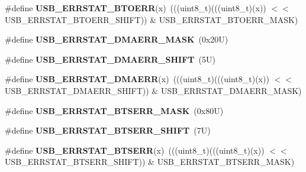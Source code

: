 \begin{DoxyCompactItemize}
\item 
\mbox{\label{group___u_s_b___register___masks_ga0f32da23ed144ba6c95ef2e68c22c4f7}} 
\#define {\bfseries U\+S\+B\+\_\+\+E\+R\+R\+S\+T\+A\+T\+\_\+\+B\+T\+O\+E\+RR}(x)~(((uint8\+\_\+t)(((uint8\+\_\+t)(x)) $<$$<$ U\+S\+B\+\_\+\+E\+R\+R\+S\+T\+A\+T\+\_\+\+B\+T\+O\+E\+R\+R\+\_\+\+S\+H\+I\+FT)) \& U\+S\+B\+\_\+\+E\+R\+R\+S\+T\+A\+T\+\_\+\+B\+T\+O\+E\+R\+R\+\_\+\+M\+A\+SK)
\item 
\mbox{\label{group___u_s_b___register___masks_ga3941bf3fbbca724b3b26a09bb2432581}} 
\#define {\bfseries U\+S\+B\+\_\+\+E\+R\+R\+S\+T\+A\+T\+\_\+\+D\+M\+A\+E\+R\+R\+\_\+\+M\+A\+SK}~(0x20\+U)
\item 
\mbox{\label{group___u_s_b___register___masks_ga2e3f280874ee203f1f801206ab4254be}} 
\#define {\bfseries U\+S\+B\+\_\+\+E\+R\+R\+S\+T\+A\+T\+\_\+\+D\+M\+A\+E\+R\+R\+\_\+\+S\+H\+I\+FT}~(5\+U)
\item 
\mbox{\label{group___u_s_b___register___masks_ga8a112763a1361e1452f77f165a289833}} 
\#define {\bfseries U\+S\+B\+\_\+\+E\+R\+R\+S\+T\+A\+T\+\_\+\+D\+M\+A\+E\+RR}(x)~(((uint8\+\_\+t)(((uint8\+\_\+t)(x)) $<$$<$ U\+S\+B\+\_\+\+E\+R\+R\+S\+T\+A\+T\+\_\+\+D\+M\+A\+E\+R\+R\+\_\+\+S\+H\+I\+FT)) \& U\+S\+B\+\_\+\+E\+R\+R\+S\+T\+A\+T\+\_\+\+D\+M\+A\+E\+R\+R\+\_\+\+M\+A\+SK)
\item 
\mbox{\label{group___u_s_b___register___masks_ga9cfa1a07c56005e5d545ecf363c4e916}} 
\#define {\bfseries U\+S\+B\+\_\+\+E\+R\+R\+S\+T\+A\+T\+\_\+\+B\+T\+S\+E\+R\+R\+\_\+\+M\+A\+SK}~(0x80\+U)
\item 
\mbox{\label{group___u_s_b___register___masks_ga4827905bfe176b3ba2992ce3ff9a4575}} 
\#define {\bfseries U\+S\+B\+\_\+\+E\+R\+R\+S\+T\+A\+T\+\_\+\+B\+T\+S\+E\+R\+R\+\_\+\+S\+H\+I\+FT}~(7\+U)
\item 
\mbox{\label{group___u_s_b___register___masks_ga39fb37eab07bf9b12d9ef56c7181a511}} 
\#define {\bfseries U\+S\+B\+\_\+\+E\+R\+R\+S\+T\+A\+T\+\_\+\+B\+T\+S\+E\+RR}(x)~(((uint8\+\_\+t)(((uint8\+\_\+t)(x)) $<$$<$ U\+S\+B\+\_\+\+E\+R\+R\+S\+T\+A\+T\+\_\+\+B\+T\+S\+E\+R\+R\+\_\+\+S\+H\+I\+FT)) \& U\+S\+B\+\_\+\+E\+R\+R\+S\+T\+A\+T\+\_\+\+B\+T\+S\+E\+R\+R\+\_\+\+M\+A\+SK)
\end{DoxyCompactItemize}

